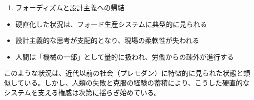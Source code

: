 \begin{enumerate}
\def\labelenumi{\arabic{enumi}.}
\setcounter{enumi}{2}
\tightlist
\item
  フォーディズムと設計主義への帰結
\end{enumerate}

\begin{itemize}
\tightlist
\item
  硬直化した状況は、フォード生産システムに典型的に見られる
\item
  設計主義的な思考が支配的となり、現場の柔軟性が失われる
\item
  人間は「機械の一部」として量的に扱われ、労働からの疎外が進行する
\end{itemize}

このような状況は、近代以前の社会（プレモダン）に特徴的に見られた状態と類似している。しかし、人類の失敗と克服の経験の蓄積により、こうした硬直的なシステムを支える権威は次第に揺らぎ始めている。
